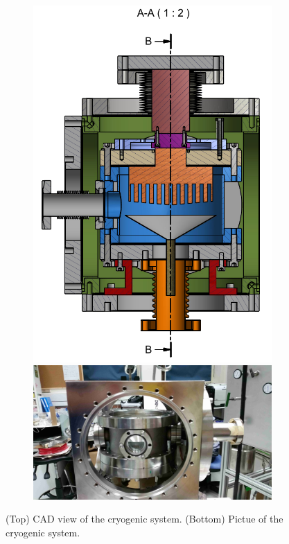 \begin{figure}
   \centering
    \begin{subfigure}[b]{0.25\textheight}
    \includegraphics[width=\textwidth]{cryogenic1.png}
    \includegraphics[width=\textwidth]{CryoOpen_small.jpg}
    \end{subfigure}
        \caption{(Top) CAD view of the cryogenic system. (Bottom) Pictue of the cryogenic system. \label{fig:cryo}}
\end{figure}



